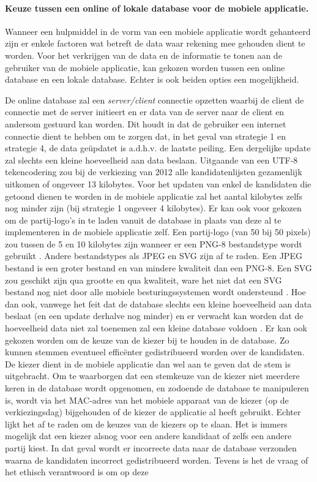 \paragraph{Keuze tussen een online of lokale database voor de mobiele applicatie.}
Wanneer een hulpmiddel in de vorm van een mobiele applicatie wordt gehanteerd zijn er enkele factoren wat betreft de data waar rekening mee gehouden dient te worden. Voor het verkrijgen van de data en de informatie te tonen aan de gebruiker van de mobiele applicatie, kan gekozen worden tussen een online database en een lokale database. Echter is ook beiden opties een mogelijkheid.  

De online database zal een \textit{server/client} \citep{Chapt17:online} connectie opzetten waarbij de client de connectie met de server initieert en er data van de server naar de client en andersom gestuurd kan worden. Dit houdt in dat de gebruiker een internet connectie dient te hebben om te zorgen dat, in het geval van strategie 1 en strategie 4, de data ge\"{u}pdatet is a.d.h.v. de laatste peiling. Een dergelijke update zal slechts een kleine hoeveelheid aan data beslaan. Uitgaande van een UTF-8 tekencodering \citep{yergeau2003utf} zou bij de verkiezing van 2012 alle kandidatenlijsten gezamenlijk uitkomen of ongeveer 13 kilobytes. Voor het updaten van enkel de kandidaten die getoond dienen te worden in de mobiele applicatie zal het aantal kilobytes zelfs nog minder zijn (bij strategie 1 ongeveer 4 kilobytes). Er kan ook voor gekozen om de partij-logo's in te laden vanuit de database in plaats van deze al te implementeren in de mobiele applicatie zelf.  Een partij-logo (van 50 bij 50 pixels) zou tussen de 5 en 10 kilobytes zijn wanneer er een PNG-8 bestandstype wordt gebruikt \cite{image39:online,miano1999compressed}. Andere bestandstypes als JPEG en SVG zijn af te raden. Een JPEG bestand is een groter bestand en van mindere kwaliteit dan een PNG-8. Een SVG zou geschikt zijn qua grootte en qua kwaliteit, ware het niet dat een SVG bestand nog niet door alle mobiele besturingssystemen wordt ondersteund \cite{CanIu25:online}. Hoe dan ook, vanwege het feit dat de database slechts een kleine hoeveelheid aan data beslaat (en een update derhalve nog minder) en er verwacht kan worden dat de hoeveelheid data niet zal toenemen zal een kleine database voldoen \citep{silberschatz1997database}. Er kan ook gekozen worden om de keuze van de kiezer bij te houden in de database. Zo kunnen stemmen eventueel effic\"{e}nter gedistribueerd worden over de kandidaten. De kiezer dient in de mobiele applicatie dan wel aan te geven dat de stem is uitgebracht. Om te waarborgen dat een stemkeuze van de kiezer niet meerdere keren in de database wordt opgenomen, en zodoende de database te manipuleren is, wordt via het MAC-adres van het mobiele apparaat van de kiezer (op de verkiezingsdag) bijgehouden of de kiezer de applicatie al heeft gebruikt. Echter lijkt het af te raden om de keuzes van de kiezers op te slaan. Het is immers mogelijk dat een kiezer alsnog voor een andere kandidaat of zelfs een andere partij kiest. In dat geval wordt er incorrecte data naar de database verzonden waarna de kandidaten incorrect gedistribueerd worden. Tevens is het de vraag of het ethisch verantwoord is om op deze 